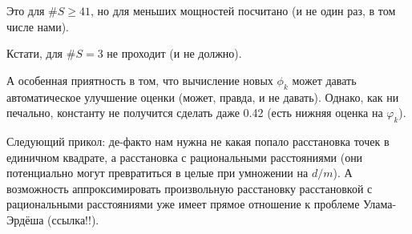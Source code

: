 Это для $\#S \geq 41$, но для меньших мощностей посчитано (и не один раз, в том числе нами).

Кстати, для $\#S = 3$ не проходит (и не должно).

А особенная приятность в том, что вычисление новых $\phi_k$ может давать автоматическое улучшение оценки
(может, правда, и не давать).
Однако, как ни печально, константу не получится сделать даже 0.42 (есть нижняя оценка на $\varphi_k$).

Следующий прикол:
де-факто нам нужна не какая попало расстановка точек в единичном квадрате,
а расстановка с рациональными расстояниями (они потенциально могут превратиться в целые при умножении на $d/m$).
А возможность аппроксимировать произвольную расстановку расстановкой с рациональными расстояниями
уже имеет прямое отношение к проблеме Улама-Эрдёша (ссылка!!).
